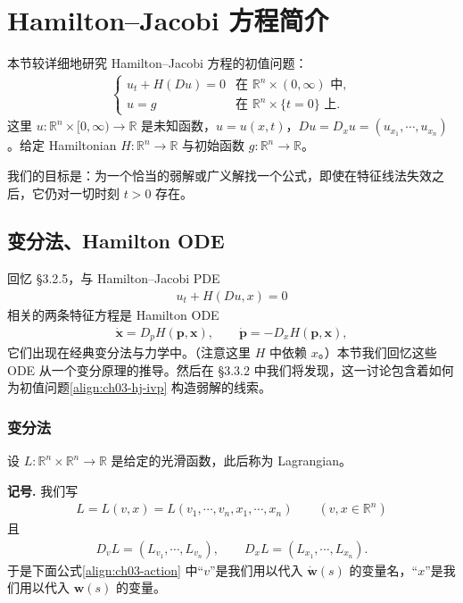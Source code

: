 \documentclass[../../main.tex]{subfiles}
\begin{document}
\section{Hamilton--Jacobi 方程简介}\label{section:ch03-hj}

本节较详细地研究 Hamilton--Jacobi 方程的初值问题：
\begin{align}\label{align:ch03-hj-ivp}
\begin{cases}
u_t+H(Du)=0 & \text{在 }\mathbb{R}^n\times(0,\infty)\text{ 中},\\
u=g & \text{在 }\mathbb{R}^n\times\{t=0\}\text{ 上}.
\end{cases}
\end{align}
这里 $u:\mathbb{R}^n\times[0,\infty)\to\mathbb{R}$ 是未知函数，$u=u(x,t)$，$Du=D_xu=(u_{x_1},\cdots,u_{x_n})$。给定 Hamiltonian $H:\mathbb{R}^n\to\mathbb{R}$ 与初始函数 $g:\mathbb{R}^n\to\mathbb{R}$。

我们的目标是：为一个恰当的弱解或广义解找一个公式，即使在特征线法失效之后，它仍对一切时刻 $t>0$ 存在。

\subsection{变分法、Hamilton ODE}\label{subsection:ch03-calcvar}

回忆 \S3.2.5，与 Hamilton--Jacobi PDE
\begin{align*}
u_t+H(Du,x)=0
\end{align*}
相关的两条特征方程是 Hamilton ODE
\begin{align*}
\dot{\mathbf{x}}=D_p H(\mathbf{p},\mathbf{x}),\qquad \dot{\mathbf{p}}=-D_x H(\mathbf{p},\mathbf{x}),
\end{align*}
它们出现在经典变分法与力学中。（注意这里 $H$ 中依赖 $x$。）本节我们回忆这些 ODE 从一个变分原理的推导。然后在 \S3.3.2 中我们将发现，这一讨论包含着如何为初值问题\eqref{align:ch03-hj-ivp} 构造弱解的线索。

\subsubsection{变分法}

设 $L:\mathbb{R}^n\times\mathbb{R}^n\to\mathbb{R}$ 是给定的光滑函数，此后称为 Lagrangian。

\textbf{记号.} 我们写
\begin{align*}
L=L(v,x)=L(v_1,\cdots,v_n,x_1,\cdots,x_n) \qquad (v,x\in\mathbb{R}^n)
\end{align*}
且
\begin{align*}
D_v L=(L_{v_1},\cdots,L_{v_n}),\qquad D_x L=(L_{x_1},\cdots,L_{x_n}).
\end{align*}
于是下面公式\eqref{align:ch03-action} 中``$v$''是我们用以代入 $\dot{\mathbf{w}}(s)$ 的变量名，``$x$''是我们用以代入 $\mathbf{w}(s)$ 的变量。
\end{document}

